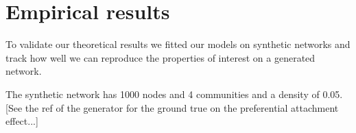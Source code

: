 \documentclass[a4paper, 12pt]{article}
\begin{document}
\section{Empirical results}

To validate our theoretical results we fitted our models on synthetic networks and track how well we can reproduce the properties of interest on a generated network.

The synthetic network has 1000 nodes and 4 communities and a density of 0.05. [See the ref of the generator for the ground true on the preferential attachment effect...]

%
%
%	
%
%
%	
%	
%
%
%
%
%
%
%
\clearpage
\end{document}

